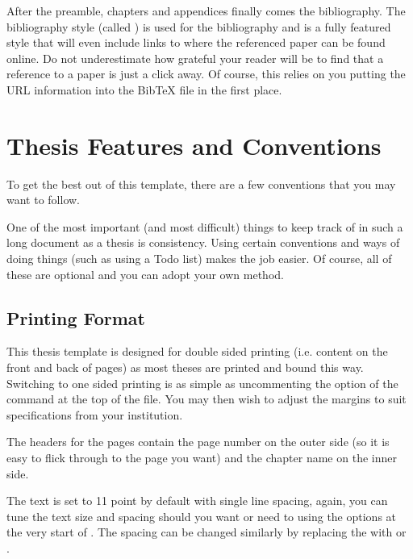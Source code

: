 After the preamble, chapters and appendices finally comes the bibliography.
The bibliography style (called ) is used for the bibliography and is a fully featured style that will even include links to where the referenced paper can be found online.
Do not underestimate how grateful your reader will be to find that a reference to a paper is just a click away.
Of course, this relies on you putting the URL information into the BibTeX file in the first place.


\section{Thesis Features and Conventions}\label{ThesisConventions}

To get the best out of this template, there are a few conventions that you may want to follow.

One of the most important (and most difficult) things to keep track of in such a long document as a thesis is consistency.
Using certain conventions and ways of doing things (such as using a Todo list) makes the job easier.
Of course, all of these are optional and you can adopt your own method.

\subsection{Printing Format}

This thesis template is designed for double sided printing (i.e. content on the front and back of pages) as most theses are printed and bound this way.
Switching to one sided printing is as simple as uncommenting the  option of the  command at the top of the  file.
You may then wish to adjust the margins to suit specifications from your institution.

The headers for the pages contain the page number on the outer side (so it is easy to flick through to the page you want) and the chapter name on the inner side.

The text is set to 11 point by default with single line spacing, again, you can tune the text size and spacing should you want or need to using the options at the very start of .
The spacing can be changed similarly by replacing the  with  or .

